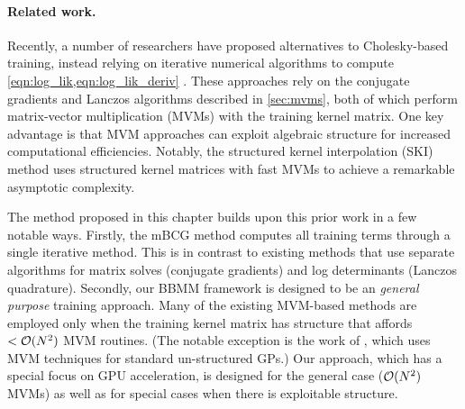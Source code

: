 \paragraph{Related work.}
Recently, a number of researchers have proposed alternatives to Cholesky-based training, instead relying on iterative numerical algorithms to compute \cref{eqn:log_lik,eqn:log_lik_deriv} \cite{cunningham2008fast,murray2009gaussian,saatcci2012scalable,wilson2014thesis,wilson2015kernel,cutajar2016preconditioning,dong2017scalable,gardner2018product}.
These approaches rely on the conjugate gradients and Lanczos algorithms described in \cref{sec:mvms}, both of which perform matrix-vector multiplication (MVMs) with the training kernel matrix.
One key advantage is that MVM approaches can exploit algebraic structure for increased computational efficiencies.
Notably, the structured kernel interpolation (SKI) method \cite{wilson2015kernel} uses structured kernel matrices with fast MVMs to achieve a remarkable asymptotic complexity.

The method proposed in this chapter builds upon this prior work in a few notable ways.
Firstly, the mBCG method computes all training terms through a single iterative method.
This is in contrast to existing methods that use separate algorithms for matrix solves (conjugate gradients) and log determinants (Lanczos quadrature).
Secondly, our BBMM framework is designed to be an \emph{general purpose} training approach.
Many of the existing MVM-based methods are employed only when the training kernel matrix has structure that affords $< \bigo{N^2}$ MVM routines.
(The notable exception is the work of \citet{cutajar2016preconditioning}, which uses MVM techniques for standard un-structured GPs.)
Our approach, which has a special focus on GPU acceleration, is designed for the general case ($\bigo{N^2}$ MVMs) as well as for special cases when there is exploitable structure.
